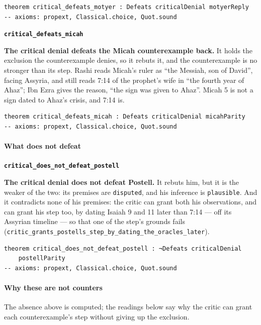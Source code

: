 \documentclass[11pt]{article}
\begin{document}
{\small\begin{verbatim}
theorem critical_defeats_motyer : Defeats criticalDenial motyerReply
-- axioms: propext, Classical.choice, Quot.sound
\end{verbatim}}
\par\medskip\noindent\textbf{\texttt{critical\_\allowbreak{}defeats\_\allowbreak{}micah}}\par\nobreak\noindent
\textbf{The critical denial defeats the Micah counterexample back.} It holds the exclusion the counterexample denies, so it rebuts it, and the counterexample is no stronger than its step. Rashi reads Micah’s ruler as “the Messiah, son of David”, facing Assyria, and still reads 7:14 of the prophet’s wife in “the fourth year of Ahaz”; Ibn Ezra gives the reason, “the sign was given to Ahaz”. Micah 5 is not a sign dated to Ahaz’s crisis, and 7:14 is.

{\small\begin{verbatim}
theorem critical_defeats_micah : Defeats criticalDenial micahParity
-- axioms: propext, Classical.choice, Quot.sound
\end{verbatim}}
\paragraph*{What does not defeat}
\leavevmode\par\nobreak
\par\medskip\noindent\textbf{\texttt{critical\_\allowbreak{}does\_\allowbreak{}not\_\allowbreak{}defeat\_\allowbreak{}postell}}\par\nobreak\noindent
\textbf{The critical denial does not defeat Postell.} It rebuts him, but it is the weaker of the two: its premises are \texttt{disputed}, and his inference is \texttt{plausible}. And it contradicts none of his premises: the critic can grant both his observations, and can grant his step too, by dating Isaiah 9 and 11 later than 7:14 — off its Assyrian timeline — so that one of the step’s grounds fails (\texttt{critic\_\allowbreak{}grants\_\allowbreak{}postells\_\allowbreak{}step\_\allowbreak{}by\_\allowbreak{}dating\_\allowbreak{}the\_\allowbreak{}oracles\_\allowbreak{}later}).

{\small\begin{verbatim}
theorem critical_does_not_defeat_postell : ¬Defeats criticalDenial
    postellParity
-- axioms: propext, Classical.choice, Quot.sound
\end{verbatim}}
\paragraph*{Why these are not counters}
\leavevmode\par\nobreak
The absence above is computed; the readings below say why the critic can grant each counterexample’s step without giving up the exclusion.
\end{document}
